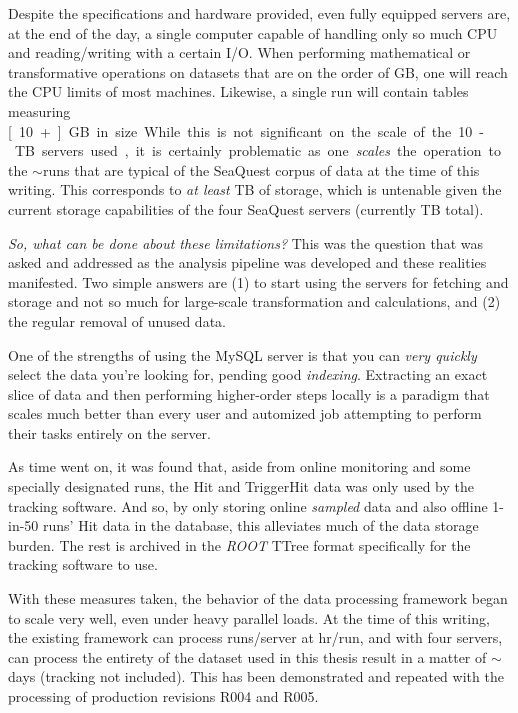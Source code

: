 Despite the specifications and hardware provided, even fully equipped servers are, at the end of the day, a single computer capable of handling only so much CPU and reading/writing with a certain I/O. When performing mathematical or transformative operations on datasets that are on the order of \unit[10]{GB}, one will reach the CPU limits of most machines. Likewise, a single run will contain tables measuring \unit[10+]{GB} in size. While this is not significant on the scale of the 10-\unit[25]{TB} servers used, it is certainly problematic as one \emph{scales} the operation to the $\sim$\unit[6000]{runs} that are typical of the SeaQuest corpus of data at the time of this writing. This corresponds to \emph{at least} \unit[60]{TB} of storage, which is untenable given the current storage capabilities of the four SeaQuest servers (currently \unit[52]{TB} total).

\emph{So, what can be done about these limitations?} This was the question that was asked and addressed as the analysis pipeline was developed and these realities manifested. Two simple answers are (1) to start using the servers for fetching and storage and not so much for large-scale transformation and calculations, and (2) the regular removal of unused data. 

One of the strengths of using the MySQL server is that you can \emph{very quickly} select the data you're looking for, pending good \emph{indexing}. Extracting an exact slice of data and then performing higher-order steps locally is a paradigm that scales much better than every user and automized job attempting to perform their tasks entirely on the server. 

As time went on, it was found that, aside from online monitoring and some specially designated runs, the Hit and TriggerHit data was only used by the tracking software. And so, by only storing online \emph{sampled} data and also offline 1-in-50 runs' Hit data in the database, this alleviates much of the data storage burden. The rest is archived in the \emph{ROOT} TTree format specifically for the tracking software to use.

With these measures taken, the behavior of the data processing framework began to scale very well, even under heavy parallel loads. At the time of this writing, the existing framework can process \unit[100]{runs/server} at \unit[2]{hr/run}, and with four servers, can process the entirety of the dataset used in this thesis result in a matter of $\sim$\unit[3]{days} (tracking not included). This has been demonstrated and repeated with the processing of production revisions R004 and R005.

